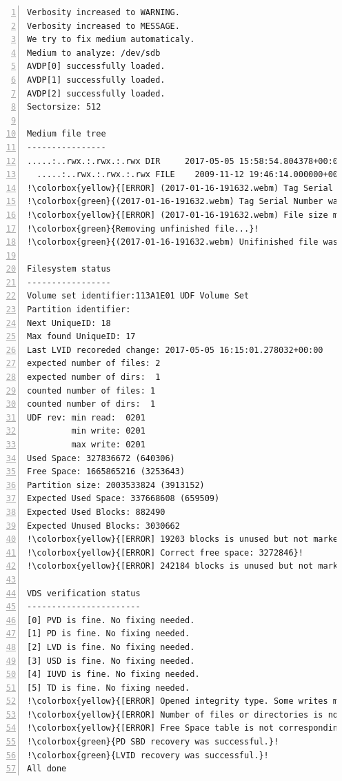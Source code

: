 \begin{lstlisting}[frame=single,caption={Výsledek opravy poškozeného média programem \texttt{udffsck}},label=lst:udffsck-pass,basicstyle=\ttfamily\scriptsize, keywordstyle=\color{black}\bfseries\underbar,nolol,numbers=left,texcl=false,escapechar=!]
Verbosity increased to WARNING.
Verbosity increased to MESSAGE.
We try to fix medium automaticaly.
Medium to analyze: /dev/sdb
AVDP[0] successfully loaded.
AVDP[1] successfully loaded.
AVDP[2] successfully loaded.
Sectorsize: 512

Medium file tree
----------------
.....:..rwx.:.rwx.:.rwx DIR     2017-05-05 15:58:54.804378+00:00       152  <ROOT>
  .....:..rwx.:.rwx.:.rwx FILE    2009-11-12 19:46:14.000000+00:00  327345425  "gtd.mp4"
!\colorbox{yellow}{[ERROR] (2017-01-16-191632.webm) Tag Serial Number differs.}!
!\colorbox{green}{(2017-01-16-191632.webm) Tag Serial Number was fixed.}!
!\colorbox{yellow}{[ERROR] (2017-01-16-191632.webm) File size mismatch. Probably unfinished file write.}!
!\colorbox{green}{Removing unfinished file...}!
!\colorbox{green}{(2017-01-16-191632.webm) Unifinished file was removed.}!

Filesystem status
-----------------
Volume set identifier:113A1E01 UDF Volume Set
Partition identifier:
Next UniqueID: 18
Max found UniqueID: 17
Last LVID recoreded change: 2017-05-05 16:15:01.278032+00:00
expected number of files: 2
expected number of dirs:  1
counted number of files: 1
counted number of dirs:  1
UDF rev: min read:  0201
         min write: 0201
         max write: 0201
Used Space: 327836672 (640306)
Free Space: 1665865216 (3253643)
Partition size: 2003533824 (3913152)
Expected Used Space: 337668608 (659509)
Expected Used Blocks: 882490
Expected Unused Blocks: 3030662
!\colorbox{yellow}{[ERROR] 19203 blocks is unused but not marked as unallocated in Free Space Table.}!
!\colorbox{yellow}{[ERROR] Correct free space: 3272846}!
!\colorbox{yellow}{[ERROR] 242184 blocks is unused but not marked as unallocated in SBD.}!

VDS verification status
-----------------------
[0] PVD is fine. No fixing needed.
[1] PD is fine. No fixing needed.
[2] LVD is fine. No fixing needed.
[3] USD is fine. No fixing needed.
[4] IUVD is fine. No fixing needed.
[5] TD is fine. No fixing needed.
!\colorbox{yellow}{[ERROR] Opened integrity type. Some writes may be unfinished.}!
!\colorbox{yellow}{[ERROR] Number of files or directories is not corresponding to counted number}!
!\colorbox{yellow}{[ERROR] Free Space table is not corresponding to reality.}!
!\colorbox{green}{PD SBD recovery was successful.}!
!\colorbox{green}{LVID recovery was successful.}!
All done
\end{lstlisting}
